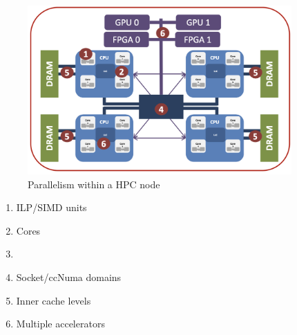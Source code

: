 \begin{minipage}{0.65\textwidth}
    \begin{figure}[H]
        \centering
        \includegraphics[width=0.9\textwidth]{assets/fig11.png}
        \caption{Parallelism within a HPC node}
        \label{fig:parallelism_hpc}
    \end{figure}
\end{minipage}
\begin{minipage}{0.25\textwidth}
    \begin{enumerate}
        \item ILP/SIMD units 
        \item Cores 
        \item 
        \item Socket/ccNuma domains 
        \item Inner cache levels 
        \item Multiple accelerators
    \end{enumerate}
\end{minipage}



